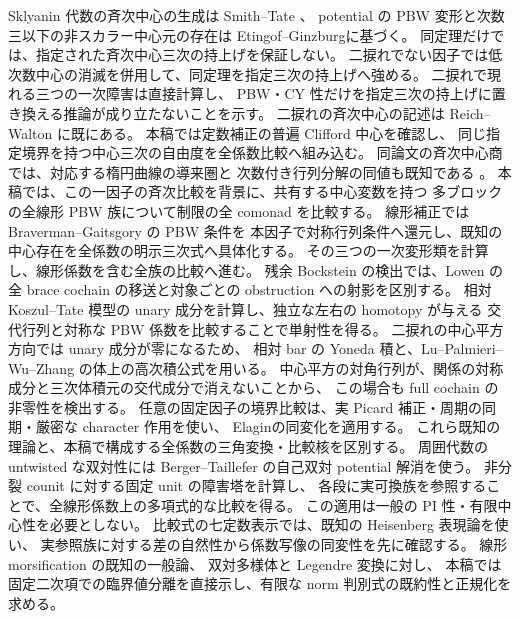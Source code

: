 Sklyanin 代数の斉次中心の生成は Smith--Tate
\cite[Theorems~3.7, 4.8]{GRSklyaninST}、
potential の PBW 変形と次数三以下の非スカラー中心元の存在は
Etingof--Ginzburg\cite[Theorem~3.3.2]{NFMEG}に基づく。
同定理だけでは、指定された斉次中心三次の持上げを保証しない。
二捩れでない因子では低次数中心の消滅を併用して、同定理を指定三次の持上げへ強める。
二捩れで現れる三つの一次障害は直接計算し、
PBW・CY 性だけを指定三次の持上げに置き換える推論が成り立たないことを示す。
二捩れの斉次中心の記述は Reich--Walton
\cite[Theorem~7.1(a)]{CMOReichWaltonOrderTwo}に既にある。
本稿では定数補正の普遍 Clifford 中心を確認し、
同じ指定境界を持つ中心三次の自由度を全係数比較へ組み込む。
同論文の斉次中心商では、対応する楕円曲線の導来圏と
次数付き行列分解の同値も既知である
\cite[Section~3.5, Theorem~3.6.2(i)]{NFMEG}。
本稿では、この一因子の斉次比較を背景に、共有する中心変数を持つ
多ブロックの全線形 PBW 族について制限の全 comonad を比較する。
線形補正では Braverman--Gaitsgory
\cite[Main Theorem~0.5, Lemma~3.3]{CMOBravermanGaitsgory}の PBW 条件を
本因子で対称行列条件へ還元し、既知の中心存在を全係数の明示三次式へ具体化する。
その三つの一次変形類を計算し、線形係数を含む全族の比較へ進む。
残余 Bockstein の検出では、Lowen
\cite[Theorems~3.21, 4.8, 4.15]{CMOLowenCharacteristic}の
全 brace cochain の移送と対象ごとの obstruction への射影を区別する。
相対 Koszul--Tate 模型の unary 成分を計算し、独立な左右の homotopy が与える
交代行列と対称な PBW 係数を比較することで単射性を得る。
二捩れの中心平方方向では unary 成分が零になるため、
相対 bar の Yoneda 積と、Lu--Palmieri--Wu--Zhang
\cite[Theorem~A, Corollary~B]{NFMLPWZExt}の体上の高次積公式を用いる。
中心平方の対角行列が、関係の対称成分と三次体積元の交代成分で消えないことから、
この場合も full cochain の非零性を検出する。
任意の固定因子の境界比較は、実 Picard 補正・周期の同期・厳密な character 作用を使い、
Elagin\cite[Lemma~8.6, Theorems~4.2, 8.7, 8.9]{MEDElagin}の同変化を適用する。
これら既知の理論と、本稿で構成する全係数の三角変換・比較核を区別する。
周囲代数の untwisted な双対性には Berger--Taillefer
\cite[Theorem~3.6, Lemma~3.7]{NFMBeTa}の自己双対 potential 解消を使う。
非分裂 counit に対する固定 unit の障害塔を計算し、
各段に実可換族を参照することで、全線形係数上の多項式的な比較を得る。
この適用は一般の PI 性・有限中心性を必要としない。
比較式の七定数表示では、既知の Heisenberg 表現論を使い、
実参照族に対する差の自然性から係数写像の同変性を先に確認する。
線形 morsification の既知の一般論\cite[Theorem~2.5]{CMOMaximTibarMorse}、
双対多様体と Legendre 変換\cite[Sections~1.2 and~1.3.B]{CMOTevelevDuality}に対し、
本稿では固定二次項での臨界値分離を直接示し、有限な norm 判別式の既約性と正規化を求める。
